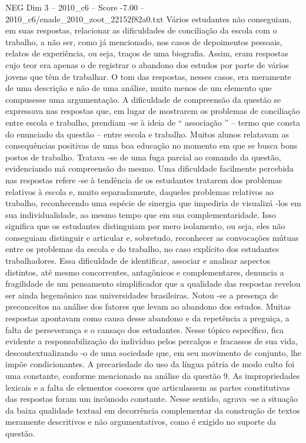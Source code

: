 \begin{textsample}{NEG Dim 3 – 2010\_c6 – Score -7.00 – 2010\_c6/enade\_2010\_zoot\_22152f82a0.txt}
Vários estudantes não conseguiam, em suas respostas, relacionar as dificuldades de conciliação da escola com o trabalho, a não ser, como já mencionado, nos casos de depoimentos pessoais, relatos de experiência, ou seja, traços de uma biografia.
Assim, eram respostas cujo teor era apenas o de registrar o abandono dos estudos por parte de vários jovens que têm de trabalhar.
O tom das respostas, nesses casos, era meramente de uma descrição e não de uma análise, muito menos de um elemento que compusesse uma argumentação.
A dificuldade de compreensão da questão se expressava nas respostas que, em lugar de mostrarem os problemas de conciliação entre escola e trabalho, prendiam -se à ideia de “ associação ” – termo que consta do enunciado da questão – entre escola e trabalho.
Muitos alunos relatavam as consequências positivas de uma boa educação no momento em que se busca bons postos de trabalho.
Tratava -se de uma fuga parcial ao comando da questão, evidenciando má compreensão do mesmo.
Uma dificuldade facilmente percebida nas respostas refere -se à tendência de os estudantes tratarem dos problemas relativos à escola e, muito separadamente, daqueles problemas relativos ao trabalho, reconhecendo uma espécie de sinergia que impediria de visualizá -los em sua individualidade, ao mesmo tempo que em sua complementaridade.
Isso significa que os estudantes distinguiam por mero isolamento, ou seja, eles não conseguiam distinguir e articular e, sobretudo, reconhecer as convocações mútuas entre os problemas da escola e do trabalho, no caso explícito dos estudantes trabalhadores.
Essa dificuldade de identificar, associar e analisar aspectos distintos, até mesmo concorrentes, antagônicos e complementares, denuncia a fragilidade de um pensamento simplificador que a qualidade das respostas revelou ser ainda hegemônico nas universidades brasileiras.
Notou -se a presença de preconceitos na análise dos fatores que levam ao abandono dos estudos.
Muitas respostas apontavam como causa desse abandono e da repetência a preguiça, a falta de perseverança e o cansaço dos estudantes.
Nesse tópico específico, fica evidente a responsabilização do indivíduo pelos percalços e fracassos de sua vida, descontextualizando -o de uma sociedade que, em seu movimento de conjunto, lhe impõe condicionantes.
A precariedade do uso da língua pátria de modo culto foi uma constante, conforme mencionado na análise da questão 9.
As impropriedades lexicais e a falta de elementos coesores que articulassem as partes constitutivas das respostas foram um incômodo constante.
Nesse sentido, agrava -se a situação da baixa qualidade textual em decorrência complementar da construção de textos meramente descritivos e não argumentativos, como é exigido no suporte da questão.

\end{textsample}
